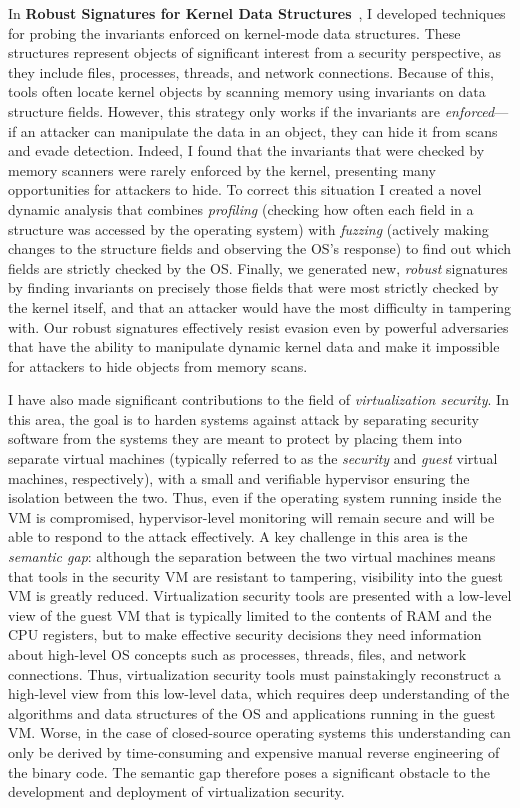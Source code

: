 \documentclass{article}
\begin{document}
In \textbf{Robust Signatures for Kernel Data
Structures}~\cite{dolangavitt2009dssig}, I developed techniques for
probing the invariants enforced on kernel-mode data structures. These
structures represent objects of significant interest from a security
perspective, as they include files, processes, threads, and network
connections. Because of this, tools often locate kernel objects by
scanning memory using invariants on data structure fields. However, this
strategy only works if the invariants are \emph{enforced}---if an
attacker can manipulate the data in an object, they can hide it from
scans and evade detection. Indeed, I found that the invariants that
were checked by memory scanners were rarely enforced by the kernel,
presenting many opportunities for attackers to hide. To correct this
situation I created a novel dynamic analysis that combines
\emph{profiling} (checking how often each field in a structure was
accessed by the operating system) with \emph{fuzzing} (actively making
changes to the structure fields and observing the OS's response) to find
out which fields are strictly checked by the OS. Finally, we generated
new, \emph{robust} signatures by finding invariants on precisely those
fields that were most strictly checked by the kernel itself, and that an
attacker would have the most difficulty in tampering with. Our robust
signatures effectively resist evasion even by powerful adversaries that
have the ability to manipulate dynamic kernel data and make it
impossible for attackers to hide objects from memory scans.

I have also made significant contributions to the field of
\emph{virtualization security}. In this area, the goal is to
harden systems against attack by separating security software from the
systems they are meant to protect by placing them into separate virtual
machines (typically referred to as the \emph{security} and \emph{guest}
virtual machines, respectively), with a small and verifiable hypervisor
ensuring the isolation between the two. Thus, even if the operating
system running inside the VM is compromised, hypervisor-level monitoring
will remain secure and will be able to respond to the attack
effectively. A key challenge in this area is the \emph{semantic gap}:
although the separation between the two virtual machines means that
tools in the security VM are resistant to tampering, visibility
into the guest VM is greatly reduced. Virtualization security tools are
presented with a low-level view of the guest VM that is typically
limited to the contents of RAM and the CPU registers, but to make
effective security decisions they need information about high-level OS
concepts such as processes, threads, files, and network connections.
Thus, virtualization security tools must painstakingly reconstruct
a high-level view from this low-level data, which requires deep
understanding of the algorithms and data structures of the OS and
applications running in the guest VM. Worse, in the case of
closed-source operating systems this understanding can only be derived
by time-consuming and expensive manual reverse engineering of the binary
code. The semantic gap therefore poses a significant obstacle to the
development and deployment of virtualization security.
\end{document}
